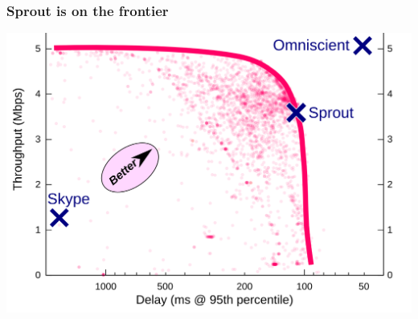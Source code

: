 \documentclass[svgnames]{beamer}
\begin{document}
\begin{frame}
\frametitle{Sprout is on the frontier}

\begin{centering}
\includegraphics[width=0.9\columnwidth]{pointplot-withhull.png}

\end{centering}

\end{frame}

%
%
%

%
%
%
%
%
%
%
%
%
%
\end{document}
